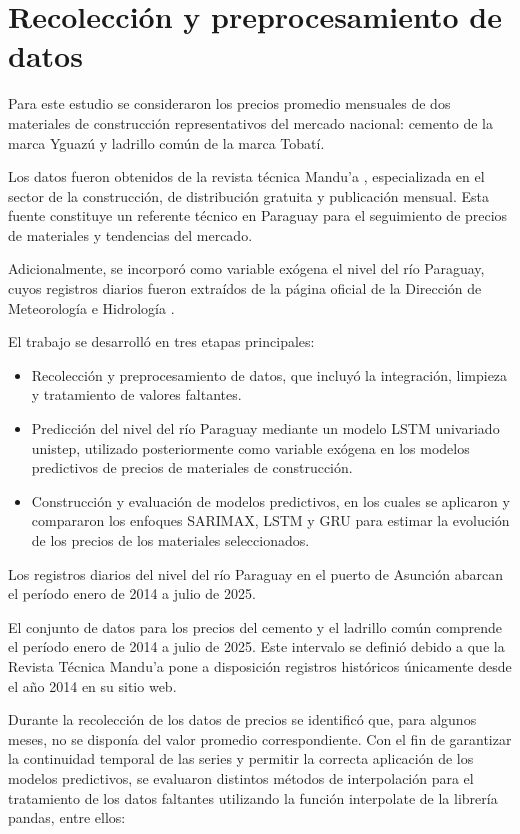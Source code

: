 \vspace{0.5cm}
\section{Recolección y preprocesamiento de datos}
\vspace{0.5cm}
\justify
Para este estudio se consideraron los precios promedio mensuales de dos materiales de construcción representativos del mercado nacional: cemento de la marca Yguazú y ladrillo común de la marca Tobatí.

\justify
Los datos fueron obtenidos de la revista técnica Mandu'a \cite{mandua}, especializada en el sector de la construcción, de distribución gratuita y publicación mensual. Esta fuente constituye un referente técnico en Paraguay para el seguimiento de precios de materiales y tendencias del mercado.

\justify
Adicionalmente, se incorporó como variable exógena el nivel del río Paraguay, cuyos registros diarios fueron extraídos de la página oficial de la Dirección de Meteorología e Hidrología \cite{dmh}.

\justify
El trabajo se desarrolló en tres etapas principales:
\begin{itemize}
\item Recolección y preprocesamiento de datos, que incluyó la integración, limpieza y tratamiento de valores faltantes.
\item Predicción del nivel del río Paraguay mediante un modelo LSTM univariado unistep, utilizado posteriormente como variable exógena en los modelos predictivos de precios de materiales de construcción.
\item Construcción y evaluación de modelos predictivos, en los cuales se aplicaron y compararon los enfoques SARIMAX, LSTM y GRU para estimar la evolución de los precios de los materiales seleccionados.
\end{itemize}

\justify
Los registros diarios del nivel del río Paraguay en el puerto de Asunción abarcan el período enero de 2014 a julio de 2025.

\justify
El conjunto de datos para los precios del cemento y el ladrillo común comprende el período enero de 2014 a julio de 2025. Este intervalo se definió debido a que la Revista Técnica Mandu'a \cite{mandua} pone a disposición registros históricos únicamente desde el año 2014 en su sitio web.

\justify
Durante la recolección de los datos de precios se identificó que, para algunos meses, no se disponía del valor promedio correspondiente. Con el fin de garantizar la continuidad temporal de las series y permitir la correcta aplicación de los modelos predictivos, se evaluaron distintos métodos de interpolación \cite{conesa2011interpolacion} para el tratamiento de los datos faltantes utilizando la función interpolate de la librería pandas, entre ellos:

